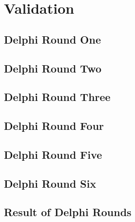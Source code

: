 \chapter{Validation}

\section{Delphi Round One}
\label{sec:validationdelphiround1}

\section{Delphi Round Two}
\label{sec:validationdelphiround2}

\section{Delphi Round Three}
\label{sec:validationdelphiround3}

\section{Delphi Round Four}
\label{sec:validationdelphiround4}


\section{Delphi Round Five}
\label{sec:validationdelphiround5}


\section{Delphi Round Six}
\label{sec:validationdelphiround6}


\section{Result of Delphi Rounds}
\label{sec:validationdelphiresults}

